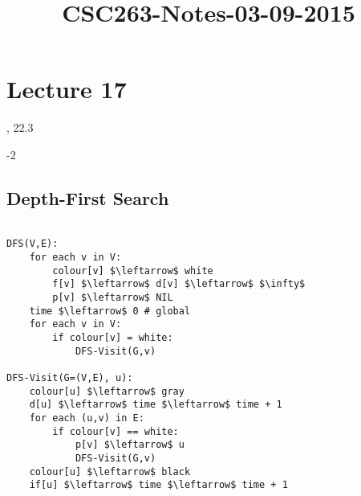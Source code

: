



\title{CSC263-Notes-03-09-2015}



\section*{Lecture 17}

\reversemarginpar
\mpreadings

, 22.3 \\

\mpselftest

-2

\subsection*{Depth-First Search}

\begin{lstlisting}[mathescape]

DFS(V,E):
	for each v in V:
		colour[v] $\leftarrow$ white
		f[v] $\leftarrow$ d[v] $\leftarrow$ $\infty$
		p[v] $\leftarrow$ NIL
	time $\leftarrow$ 0 # global
	for each v in V:
		if colour[v] = white:
			DFS-Visit(G,v)

DFS-Visit(G=(V,E), u):
	colour[u] $\leftarrow$ gray
	d[u] $\leftarrow$ time $\leftarrow$ time + 1
	for each (u,v) in E:
		if colour[v] == white:
			p[v] $\leftarrow$ u
			DFS-Visit(G,v)
	colour[u] $\leftarrow$ black
	if[u] $\leftarrow$ time $\leftarrow$ time + 1

\end{lstlisting}

